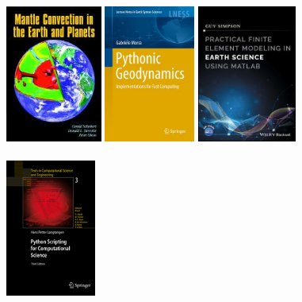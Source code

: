 \begin{center}
\includegraphics[height=4.5cm]{images/literature/sto_book}
\includegraphics[height=4.5cm]{images/literature/morra_book}
\includegraphics[height=4.5cm]{images/literature/simpson_book}\\
\cite{berc09} \hspace{1.99cm} 
\cite{scto01} \hspace{1.99cm} 
\cite{morr18} \hspace{1.99cm} 
\cite{simp17}\\
\includegraphics[height=4.5cm]{images/literature/langtangen_book}\\
\cite{lang08}
\end{center}

